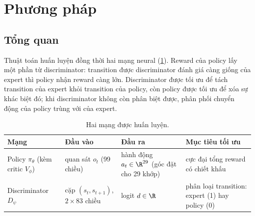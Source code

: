 \section{Phương pháp}
\subsection{Tổng quan}
Thuật toán huấn luyện đồng thời hai mạng neural (\cref{tab:nets}). Reward của policy
lấy một phần từ discriminator: transition được discriminator đánh giá càng giống của
expert thì policy nhận reward càng lớn. Discriminator được tối ưu để tách transition của
expert khỏi transition của policy, còn policy được tối ưu để xóa sự khác biệt đó; khi
discriminator không còn phân biệt được, phân phối chuyển động của policy trùng với của
expert.

\begin{table}[H]
\centering
\caption{Hai mạng được huấn luyện.}
\label{tab:nets}
\small
\begin{tabular}{@{}p{3.2cm}p{3.6cm}p{3.1cm}p{4.3cm}@{}}
\toprule
Mạng & Đầu vào & Đầu ra & Mục tiêu tối ưu \\
\midrule
Policy $\pi_\theta$ (kèm critic $V_\phi$) & quan sát $o_t$ (99 chiều) & hành động
$a_t \in \R^{29}$ (góc đặt cho 29 khớp) & cực đại tổng reward có chiết khấu \\
Discriminator $D_\psi$ & cặp $(s_t, s_{t+1})$, $2 \times 83$ chiều & logit $d \in \R$ &
phân loại transition: expert (1) hay policy (0) \\
\bottomrule
\end{tabular}
\end{table}

